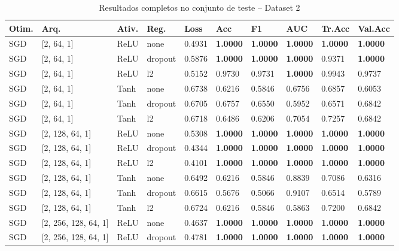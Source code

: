 \documentclass[12pt,a4paper]{article}
\begin{document}
\begin{table}[h]
\centering
\caption{Resultados completos no conjunto de teste -- Dataset 2}
\label{tab:full_results_dataset_2}
\scriptsize
\setlength{\tabcolsep}{4pt}
\begin{tabular}{llllllllll}
\toprule
\textbf{Otim.} & \textbf{Arq.} & \textbf{Ativ.} & \textbf{Reg.} & \textbf{Loss} & \textbf{Acc} & \textbf{F1} & \textbf{AUC} & \textbf{Tr.Acc} & \textbf{Val.Acc} \\
\midrule
SGD & [2, 64, 1] & ReLU & none & 0.4931 & \textbf{1.0000} & \textbf{1.0000} & \textbf{1.0000} & \textbf{1.0000} & \textbf{1.0000} \\
SGD & [2, 64, 1] & ReLU & dropout & 0.5876 & \textbf{1.0000} & \textbf{1.0000} & \textbf{1.0000} & 0.9371 & \textbf{1.0000} \\
SGD & [2, 64, 1] & ReLU & l2 & 0.5152 & 0.9730 & 0.9731 & \textbf{1.0000} & 0.9943 & 0.9737 \\
SGD & [2, 64, 1] & Tanh & none & 0.6738 & 0.6216 & 0.5846 & 0.6756 & 0.6857 & 0.6053 \\
SGD & [2, 64, 1] & Tanh & dropout & 0.6705 & 0.6757 & 0.6550 & 0.5952 & 0.6571 & 0.6842 \\
SGD & [2, 64, 1] & Tanh & l2 & 0.6718 & 0.6486 & 0.6206 & 0.7054 & 0.7257 & 0.6842 \\
SGD & [2, 128, 64, 1] & ReLU & none & 0.5308 & \textbf{1.0000} & \textbf{1.0000} & \textbf{1.0000} & \textbf{1.0000} & \textbf{1.0000} \\
SGD & [2, 128, 64, 1] & ReLU & dropout & 0.4344 & \textbf{1.0000} & \textbf{1.0000} & \textbf{1.0000} & \textbf{1.0000} & \textbf{1.0000} \\
SGD & [2, 128, 64, 1] & ReLU & l2 & 0.4101 & \textbf{1.0000} & \textbf{1.0000} & \textbf{1.0000} & \textbf{1.0000} & \textbf{1.0000} \\
SGD & [2, 128, 64, 1] & Tanh & none & 0.6492 & 0.6216 & 0.5846 & 0.8839 & 0.7086 & 0.6316 \\
SGD & [2, 128, 64, 1] & Tanh & dropout & 0.6615 & 0.5676 & 0.5066 & 0.9107 & 0.6514 & 0.5789 \\
SGD & [2, 128, 64, 1] & Tanh & l2 & 0.6724 & 0.6216 & 0.5846 & 0.5863 & 0.7200 & 0.6842 \\
SGD & [2, 256, 128, 64, 1] & ReLU & none & 0.4637 & \textbf{1.0000} & \textbf{1.0000} & \textbf{1.0000} & \textbf{1.0000} & \textbf{1.0000} \\
SGD & [2, 256, 128, 64, 1] & ReLU & dropout & 0.4781 & \textbf{1.0000} & \textbf{1.0000} & \textbf{1.0000} & \textbf{1.0000} & \textbf{1.0000} \\

\end{tabular}
\end{table}
\end{document}
